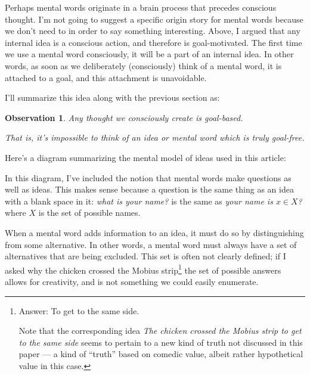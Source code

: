 \documentclass[11pt, oneside]{article}   	%
\newtheorem{obs}{Observation}
\begin{document}
Perhaps mental words originate in a brain process that precedes conscious
thought.
I'm not going to suggest a specific origin story for mental words
because we don't need
to in order to say something interesting.
Above, I argued that any internal idea is a conscious action, and therefore is
goal-motivated. The first time we use a mental word consciously, it will be a
part of an internal idea. In other words, as soon as we deliberately
(consciously) think of a mental word, it is attached to a goal, and this
attachment is unavoidable.

I'll summarize this idea along with the previous section as:
\begin{obs}
    Any thought we consciously create is goal-based.

    \medskip

    That is, it's impossible to think of an idea or mental word which is
    truly goal-free.
\end{obs}

Here's a diagram summarizing the mental model of ideas used in this
article:

\begin{center}
%
\end{center}

In this diagram, I've included the notion that mental words make questions as
well as ideas. This makes sense because a question is the same thing as an idea
with a blank space in it: {\em what is your name?} is the same as
{\em your name is $x\in X$?} where $X$ is the set of possible names.

When a mental word adds information to an idea, it must do so by distinguishing
from some alternative. In other words, a mental word must always have a set of
alternatives that are being excluded. This set is often not clearly defined; if
I asked why the chicken crossed the Mobius strip\footnote{Answer: To
get to the same side.\par Note that the corresponding idea {\em The chicken
crossed the Mobius strip to get to the same side} seems to pertain to a new
kind of truth not discussed in this paper ---
a kind of ``truth'' based on comedic
value, albeit rather hypothetical value in this case.}
the set of possible answers allows for creativity, and is not something we could
easily enumerate.
\end{document}
